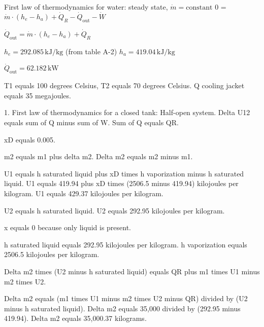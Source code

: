 First law of thermodynamics for water: steady state, \( \dot{m} = \text{constant} \)  
0 = \( \dot{m} \cdot (h_e - h_a) + \dot{Q}_R - \dot{Q}_{\text{out}} - \dot{W} \)  

\( \dot{Q}_{\text{out}} = \dot{m} \cdot (h_e - h_a) + \dot{Q}_R \)  

\( h_e = 292.085 \, \text{kJ/kg} \) (from table A-2)  
\( h_a = 419.04 \, \text{kJ/kg} \)  

\( \dot{Q}_{\text{out}} = 62.182 \, \text{kW} \)

T1 equals 100 degrees Celsius, T2 equals 70 degrees Celsius.  
Q cooling jacket equals 35 megajoules.  

1. First law of thermodynamics for a closed tank: Half-open system.  
Delta U12 equals sum of Q minus sum of W.  
Sum of Q equals QR.  

xD equals 0.005.  

m2 equals m1 plus delta m2.  
Delta m2 equals m2 minus m1.  

U1 equals h saturated liquid plus xD times h vaporization minus h saturated liquid.  
U1 equals 419.94 plus xD times (2506.5 minus 419.94) kilojoules per kilogram.  
U1 equals 429.37 kilojoules per kilogram.  

U2 equals h saturated liquid.  
U2 equals 292.95 kilojoules per kilogram.  

x equals 0 because only liquid is present.  

h saturated liquid equals 292.95 kilojoules per kilogram.  
h vaporization equals 2506.5 kilojoules per kilogram.  

Delta m2 times (U2 minus h saturated liquid) equals QR plus m1 times U1 minus m2 times U2.  

Delta m2 equals (m1 times U1 minus m2 times U2 minus QR) divided by (U2 minus h saturated liquid).  
Delta m2 equals 35,000 divided by (292.95 minus 419.94).  
Delta m2 equals 35,000.37 kilograms.